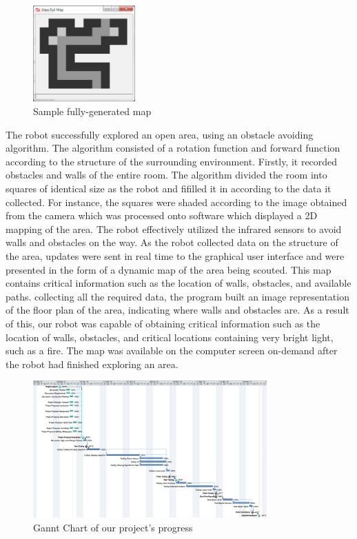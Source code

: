 \documentclass[12pt]{article}
\begin{document}
\begin{figure}[ht]
\centering
\includegraphics[width=0.35\textwidth]{entiremap.png}
\caption{Sample fully-generated map}
\end{figure}

The robot successfully explored an open area, using an obstacle avoiding algorithm. The al­gorithm consisted of a rotation function and forward function according to the structure of the surrounding environment. Firstly, it recorded obstacles and walls of the entire room. The algo­rithm divided the room into squares of identical size as the robot and fifilled it in according to the data it collected. For instance, the squares were shaded according to the image obtained from the camera which was processed onto software which displayed a 2D mapping of the area. The robot effectively utilized the infrared sensors to avoid walls and obstacles on the way. As the robot collected data on the structure of the area, updates were sent in real time to the graphical user interface and were presented in the form of a dynamic map of the area being scouted. This map contains critical information such as the location of walls, obstacles, and available paths. collecting all the required data, the program built an image representation of the ﬂoor plan of the area, indicating where walls and obstacles are. As a result of this, our robot was capable of obtaining critical information such as the location of walls, obstacles, and critical loca­tions containing very bright light, such as a fire. The map was available on the computer screen on-demand after the robot had finished exploring an area.\\

\begin{figure}[ht]
\centering
\includegraphics[width=0.8\textwidth]{gannt.png}
\caption{Gannt Chart of our project's progress}
\end{figure}
\end{document}
